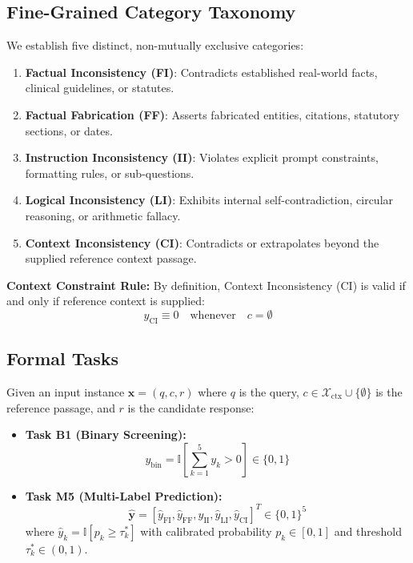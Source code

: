 \documentclass[conference]{IEEEtran}
\begin{document}
\subsection{Fine-Grained Category Taxonomy}
We establish five distinct, non-mutually exclusive categories:
\begin{enumerate}
    \item \textbf{Factual Inconsistency (FI)}: Contradicts established real-world facts, clinical guidelines, or statutes.
    \item \textbf{Factual Fabrication (FF)}: Asserts fabricated entities, citations, statutory sections, or dates.
    \item \textbf{Instruction Inconsistency (II)}: Violates explicit prompt constraints, formatting rules, or sub-questions.
    \item \textbf{Logical Inconsistency (LI)}: Exhibits internal self-contradiction, circular reasoning, or arithmetic fallacy.
    \item \textbf{Context Inconsistency (CI)}: Contradicts or extrapolates beyond the supplied reference context passage.
\end{enumerate}

\noindent\textbf{Context Constraint Rule:} By definition, Context Inconsistency (CI) is valid if and only if reference context is supplied:
\begin{equation}
y_{\text{CI}} \equiv 0 \quad \text{whenever} \quad c = \emptyset
\label{eq:ci_constraint}
\end{equation}

\subsection{Formal Tasks}
Given an input instance $\mathbf{x} = (q, c, r)$ where $q$ is the query, $c \in \mathcal{X}_{\text{ctx}} \cup \{\emptyset\}$ is the reference passage, and $r$ is the candidate response:
\begin{itemize}
    \item \textbf{Task B1 (Binary Screening):}
    \begin{equation}
    y_{\text{bin}} = \mathbb{I}\left[\sum_{k=1}^5 y_k > 0\right] \in \{0, 1\}
    \label{eq:task_b1}
    \end{equation}
    \item \textbf{Task M5 (Multi-Label Prediction):}
    \begin{equation}
    \hat{\mathbf{y}} = [\hat{y}_{\text{FI}}, \hat{y}_{\text{FF}}, \hat{y}_{\text{II}}, \hat{y}_{\text{LI}}, \hat{y}_{\text{CI}}]^T \in \{0, 1\}^5
    \label{eq:task_m5}
    \end{equation}
    where $\hat{y}_k = \mathbb{I}[p_k \ge \tau_k^*]$ with calibrated probability $p_k \in [0, 1]$ and threshold $\tau_k^* \in (0, 1)$.
\end{itemize}
\end{document}
